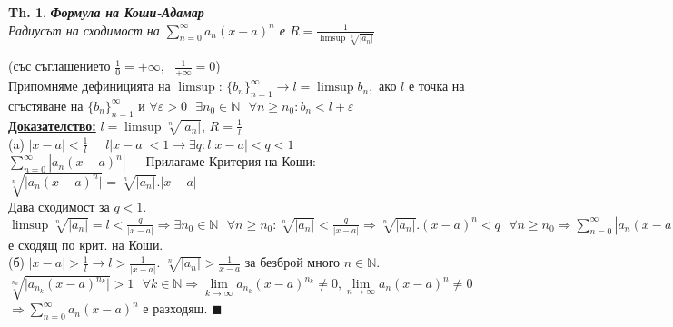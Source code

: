 \documentclass[12pt]{article}
\newtheorem{theorem}{Th.}
\newcommand{\spc}{\text{ }}
\begin{document}
	\begin{theorem}
		\textbf{Формула на Коши-Адамар}\\
		Радиусът на сходимост на $\sum_{n=0}^{\infty}a_n(x-a)^n$ е $R = \frac{1}{\limsup\sqrt[n]{\mathbf{|}a_n\mathbf{|}}}$
	\end{theorem}
	(със съглашението $\textstyle\frac{1}{0}=+\infty,\spc\frac{1}{+\infty}=0$)\\
	Припомняме дефиницията на $\limsup$: $\{b_n\}_{n=1}^{\infty}\rightarrow l = \limsup b_n,$ ако $l$ е точка на сгъстяване на $\{b_n\}_{n=1}^{\infty}$ и $\forall \varepsilon > 0 \spc\exists n_0 \in \mathbb{N} \spc\forall n \geq n_0 : b_n < l + \varepsilon$\\
	
	\textbf{\underline{Доказателство:}} $l = \limsup\sqrt[n]{|a_n|}$, $R = \frac{1}{l}$\\
	(a) $|x-a|<\frac{1}{l}$ $\quad l|x-a|<1\rightarrow \exists q : l|x-a|<q<1$\\
	$\sum_{n=0}^{\infty}|a_n(x-a)^n| - $ Прилагаме Критерия на Коши: $\sqrt[n]{\mathbf{|}a_n(x-a)^n\mathbf{|}}=\sqrt[n]{\mathbf{|}a_n\mathbf{|}}.|x-a|$\\Дава сходимост за $q<1$. 
	\begin{math}
		\limsup\sqrt[n]{\mathbf{|}a_n\mathbf{|}}=l<\frac{q}{|x-a|}\Rightarrow \exists n_0\in\mathbb{N}\spc\forall n \geq n_0 : \sqrt[n]{\mathbf{|}a_n\mathbf{|}} < \frac{q}{|x-a|}\Rightarrow \sqrt[n]{\mathbf{|}a_n\mathbf{|}}.(x-a)^n<q\spc\forall n\geq n_0
		\Rightarrow \sum_{n=0}^{\infty}|a_n(x-a)^n|
	\end{math} е сходящ по крит. на Коши.\\
	(б) $|x-a|>\frac{1}{l} \rightarrow l > \frac{1}{|x-a|}$. 
	$\sqrt[n]{\mathbf{|}a_n\mathbf{|}} > \frac{1}{x-a}$ за безброй много $n\in\mathbb{N}$. $\sqrt[n_k]{\mathbf{|}a_{n_k}(x-a)^{n_k}\mathbf{|}} > 1 \spc\forall k \in \mathbb{N} \Rightarrow \lim\limits_{k\to\infty}a_{n_k}(x-a)^{n_k} \neq 0, \lim\limits_{n\to\infty}a_{n}(x-a)^{n} \neq 0 $
	$\Rightarrow \sum_{n=0}^{\infty}a_n(x-a)^n$ е разходящ.
	\hfill$\blacksquare$\\
\end{document}

